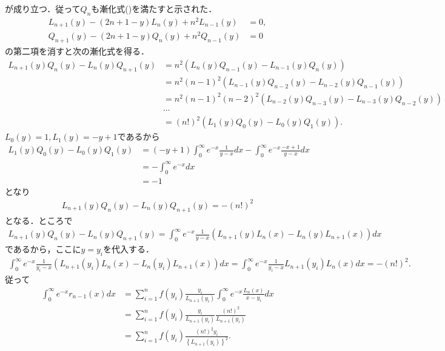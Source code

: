 \documentclass[a4j,papersize,disablejfam,slide,14pt]{jsarticle}
\def\exp#1{e^{#1}} %
\begin{document}
    が成り立つ．従って$Q_n$も漸化式()を満たすと示された．
    \begin{align}
    	L_{n+1}(y) - (2n+1-y)L_n(y) + n^2L_{n-1}(y) &= 0, \\
        Q_{n+1}(y) - (2n+1-y)Q_n(y) + n^2Q_{n-1}(y) &= 0
    \end{align}
    の第二項を消すと次の漸化式を得る．
    \begin{align}
    	L_{n+1}(y) Q_n(y) - L_n(y) Q_{n+1}(y) &= n^2 \left( L_n(y) Q_{n-1}(y) - L_{n-1}(y) Q_n(y) \right) \\
        &= n^2 (n-1)^2 \left( L_{n-1}(y) Q_{n-2}(y) - L_{n-2}(y) Q_{n-1}(y) \right) \\
        &= n^2 (n-1)^2 (n-2)^2 \left( L_{n-2}(y) Q_{n-3}(y) - L_{n-3}(y) Q_{n-2}(y) \right) \\
        &\cdots \\
        &= (n!)^2 \left( L_1(y) Q_0(y) - L_0(y) Q_1(y) \right).
    \end{align}
    $L_0(y)=1, L_1(y)=-y+1$であるから
    \begin{align}
    	L_1(y) Q_0(y) - L_0(y) Q_1(y) &= (-y+1) \int_{0}^{\infty} \exp{-x} \frac{1}{y-x} dx - \int_{0}^{\infty} \exp{-x} \frac{-x+1}{y-x} dx \\
        &= - \int_{0}^{\infty} \exp{-x} dx \\
        &= -1
    \end{align}
    となり
    \begin{align}
    	L_{n+1}(y) Q_n(y) - L_n(y) Q_{n+1}(y) = -(n!)^2
    \end{align}
    となる．ところで
    \begin{align}
    	L_{n+1}(y) Q_n(y) - L_n(y) Q_{n+1}(y) = \int_{0}^{\infty} \exp{-x} \frac{1}{y-x} \left( L_{n+1}(y)L_n(x) - L_n(y)L_{n+1}(x) \right) dx
    \end{align}
    であるから，ここに$y=y_i$を代入する．
    \begin{align}
    	\int_{0}^{\infty} \exp{-x} \frac{1}{y_i-x} \left( L_{n+1}(y_i)L_n(x) - L_n(y_i)L_{n+1}(x) \right) dx 
        = \int_{0}^{\infty} \exp{-x} \frac{1}{y_i-x} L_{n+1}(y_i)L_n(x) dx = -(n!)^2.
    \end{align}
    従って
    \begin{align}
    	\int_{0}^{\infty} \exp{-x} r_{n-1}(x) dx
        &= \sum_{i=1}^{n} f(y_i) \frac{y_i}{L_{n+1}(y_i)} \int_{0}^{\infty} \exp{-x} \frac{L_n(x)}{x-y_i}dx \\
        &= \sum_{i=1}^{n} f(y_i) \frac{y_i}{L_{n+1}(y_i)} \frac{(n!)^2}{L_{n+1}(y_i)} \\
        &= \sum_{i=1}^{n} f(y_i) \frac{(n!)^2 y_i}{\left\{L_{n+1}(y_i)\right\}^2}.
    \end{align}
    
\end{document}
